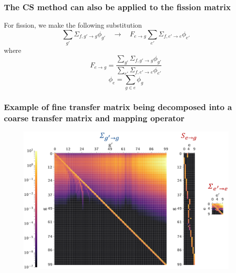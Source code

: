 \documentclass[xcolor=dvipsnames]{beamer}
\begin{document}
\begin{frame}
\frametitle{The CS method can also be applied to the fission matrix}


For fission, we make the following substitution
\begin{equation*}
\label{eq:fission}
\sum_{g'} \Sigma_{f,g'\to g} \phi_{g'} \quad \to \quad  F_{e\to g} \sum_{e'} \Sigma_{f,e'\to e} \phi_{e'} 
\end{equation*}
where 
\begin{equation*}
\label{Eq.S}
F_{e\to g}  = \frac{\sum_{g'} \Sigma_{f,g'\to g} \phi_{g'}}{ \sum_{e'} \Sigma_{f,e'\to e} \phi_{e'}} 
\end{equation*}
\begin{equation*}
\phi_{e} = \sum_{g \in e} \phi_{g} 
\end{equation*}

\end{frame}


\begin{frame}
  \frametitle{Example of fine transfer matrix being decomposed into a coarse transfer matrix and mapping operator}

\begin{figure}[ht]
  \centering
\includegraphics[width=.9\textwidth]{./graphics/matrix_decomposition.png}
\end{figure}
\end{frame}
\end{document}

